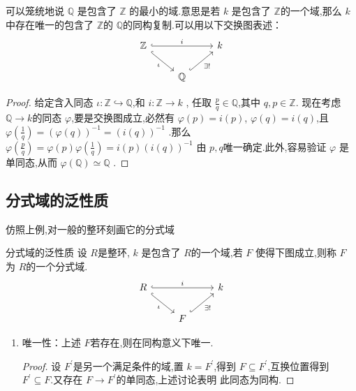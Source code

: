 \documentclass[lang=cn,12pt,color=green,fontset=none,pad]{elegantbook}
\begin{document}
\begin{proposition}
    可以笼统地说 $ \mathbb{Q} $ 是包含了 $ \mathbb{Z} $ 的最小的域.意思是若 $ k $ 是包含了 $ \mathbb{Z} $的一个域,那么 $ k $ 中存在唯一的包含了 $ \mathbb{Z} $的 $ \mathbb{Q} $的同构复制.可以用以下交换图表述： 
\[\begin{tikzcd}
	{\mathbb{Z}} && k \\
	& {\mathbb{Q}}
	\arrow["i", hook, from=1-1, to=1-3]
	\arrow["\iota"', hook, from=1-1, to=2-2]
	\arrow["{\exists !}"', hook, from=2-2, to=1-3]
\end{tikzcd}\]

\end{proposition}
\begin{proof}
    给定含入同态 $ \iota:\mathbb{Z} \hookrightarrow   \mathbb{Q} $,和 $ i: \mathbb{Z} \to k $  ,
    任取 $ \frac{p}{q} \in  \mathbb{Q}  $,其中 $ q,p \in \mathbb{Z}  $.
    现在考虑 $ \mathbb{Q} \to  k$的同态 $ \varphi $,要是交换图成立,必然有 $ \varphi\left( p \right)  =  i\left( p \right) $, $ \varphi\left( q \right)= i\left( q \right)   $,且 $ \varphi\left( \frac{1}{q} \right)= \left( \varphi\left( q \right)  \right)^{-1} = \left( i\left( q \right)  \right)^{-1}     $ .那么 $ \varphi\left( \frac{p}{q} \right)= \varphi\left( p \right) \varphi\left( \frac{1}{q} \right)= i\left( p \right) \left( i\left( q \right)  \right)^{-1}     $        由 $ p,q $唯一确定.此外,容易验证 $ \varphi $  是单同态,从而 $ \varphi\left( \mathbb{Q}  \right) \simeq \mathbb{Q}   $ .
\end{proof}

\subsection{分式域的泛性质}
仿照上例,对一般的整环刻画它的分式域
\begin{definition}{分式域的泛性质}\label{def:uni of frac F}
    设 $ R $是整环, $ k $ 是包含了 $ R $的一个域,若 $ F $ 使得下图成立,则称 $ F $ 为 $ R $的一个分式域. 
\[\begin{tikzcd}
	R && k \\
	& F
	\arrow["i", hook, from=1-1, to=1-3]
	\arrow["\iota"', hook, from=1-1, to=2-2]
	\arrow["{\exists !}"', hook, from=2-2, to=1-3]
\end{tikzcd}\]
\end{definition}

\begin{remark}
    \begin{enumerate}
        \item 唯一性：上述 $ F $若存在,则在同构意义下唯一. 
        \begin{proof}
            设 $ F^{\prime}  $是另一个满足条件的域,置 $ k= F^{\prime}  $,得到 $ F \subseteq F^{\prime}  $,互换位置得到 $ F^{\prime} \subseteq F $.又存在 $ F\to F^{\prime}  $的单同态,上述讨论表明 此同态为同构.     
        \end{proof}
    \end{enumerate}
    
\end{remark}
\end{document}
